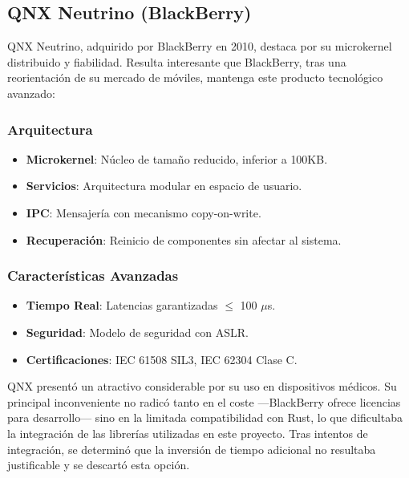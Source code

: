     \newpage
    \subsection{QNX Neutrino (BlackBerry)}
        QNX Neutrino, adquirido por BlackBerry en 2010, destaca por su microkernel distribuido y fiabilidad. Resulta interesante que BlackBerry, tras una reorientación de su mercado de móviles, mantenga este producto tecnológico avanzado:

        \subsubsection{Arquitectura}
            \begin{itemize}
                \item \textbf{Microkernel}: Núcleo de tamaño reducido, inferior a 100KB.
                \item \textbf{Servicios}: Arquitectura modular en espacio de usuario.
                \item \textbf{IPC}: Mensajería con mecanismo copy-on-write.
                \item \textbf{Recuperación}: Reinicio de componentes sin afectar al sistema.
            \end{itemize}

        \subsubsection{Características Avanzadas}
            \begin{itemize}
                \item \textbf{Tiempo Real}: Latencias garantizadas $\le$ 100 $\mu$s.
                \item \textbf{Seguridad}: Modelo de seguridad con ASLR.
                \item \textbf{Certificaciones}: IEC 61508 SIL3, IEC 62304 Clase C.
            \end{itemize}

        QNX presentó un atractivo considerable por su uso en dispositivos médicos. Su principal inconveniente no radicó tanto en el coste —BlackBerry ofrece licencias para desarrollo— sino en la limitada compatibilidad con Rust, lo que dificultaba la integración de las librerías utilizadas en este proyecto. Tras intentos de integración, se determinó que la inversión de tiempo adicional no resultaba justificable y se descartó esta opción.

